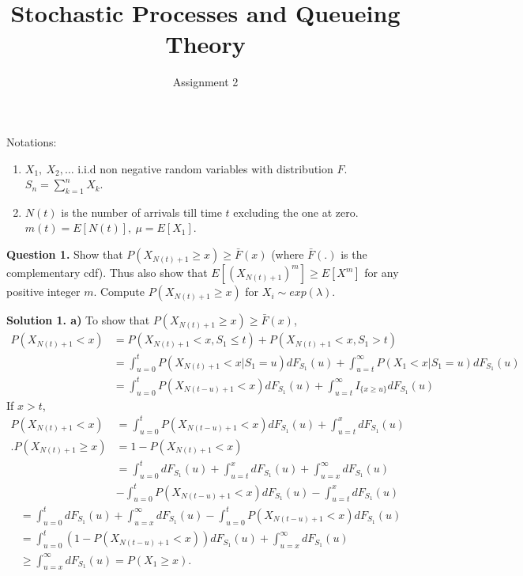 \documentclass[12,a4paper,onecolumn]{article}
\begin{document}
\title{Stochastic Processes and Queueing Theory}
\author{Assignment 2}
\maketitle

Notations: 
\begin{enumerate}
\item $X_1,~X_2,\hdots$ i.i.d non negative random variables with distribution $F$. $S_n=\sum_{k=1}^{n}X_k$.\\
\item $N(t)$ is the number of arrivals till time $t$ excluding the one at zero. $m(t)=E[N(t)],~\mu=E[X_1]$.\\
\end{enumerate}

\textbf{Question 1.} Show that $P(X_{N(t)+1}\geq x)\geq \bar{F}(x)$ (where $\bar{F}(.)$ is the complementary cdf). Thus also show that $E[(X_{N(t)+1})^m]\geq E[X^m]$ for any positive integer $m$. Compute $P(X_{N(t)+1}\geq x)$ for $X_i \sim exp(\lambda)$.

\textbf{Solution 1.  a)} To show that $P(X_{N(t)+1}\geq x)\geq \bar{F}(x)$,  \\
\begin{align*}
P(X_{N(t)+1}< x)&=P(X_{N(t)+1}< x,S_1\leq t)+P(X_{N(t)+1}< x, S_1>t)\\
&=\int_{u=0}^{t}P(X_{N(t)+1}< x|S_1=u)dF_{S_1}(u)+ \int_{u=t}^{\infty} P(X_{1}< x|S_1=u)dF_{S_1}(u)\\
&=\int_{u=0}^{t}P(X_{N(t-u)+1}< x)dF_{S_1}(u)+ \int_{u=t}^{\infty} I_{\{x\geq u \}} dF_{S_1}(u)
\end{align*}
If $x>t$,
\begin{align*}
P(X_{N(t)+1}< x)&=\int_{u=0}^{t}P(X_{N(t-u)+1}< x)dF_{S_1}(u)+ \int_{u=t}^{x}dF_{S_1}(u)\\.
P(X_{N(t)+1}\geq x)&=1-P(X_{N(t)+1}< x)\\
&=\int_{u=0}^{t}dF_{S_1}(u)+\int_{u=t}^{x}dF_{S_1}(u)+\int_{u=x}^{\infty}dF_{S_1}(u)\\
&-\int_{u=0}^{t}P(X_{N(t-u)+1}< x)dF_{S_1}(u)-\int_{u=t}^{x}dF_{S_1}(u)
\end{align*}
\begin{align*}
&=\int_{u=0}^{t}dF_{S_1}(u)+\int_{u=x}^{\infty}dF_{S_1}(u)-\int_{u=0}^{t}P(X_{N(t-u)+1}< x)dF_{S_1}(u)\\
&=\int_{u=0}^{t}(1-P(X_{N(t-u)+1}< x))dF_{S_1}(u) +\int_{u=x}^{\infty}dF_{S_1}(u)\\
&\geq \int_{u=x}^{\infty}dF_{S_1}(u)=P(X_1\geq x).\\
 \end{align*}
 
\end{document}
